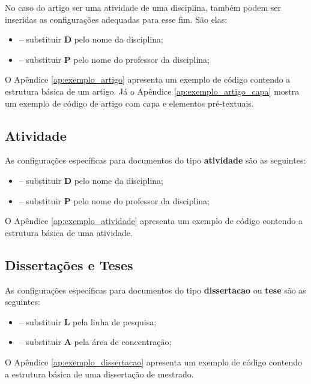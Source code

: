 \documentclass[artigo]{iftex2024}
\begin{document}
No caso do artigo ser uma atividade de uma disciplina, também podem ser inseridas as configurações adequadas para esse fim.
São elas:
\begin{itemize}
  \item[]  -- substituir \textbf{D} pelo nome da disciplina;
  \item[]  -- substituir \textbf{P} pelo nome do professor da disciplina;
\end{itemize}

O Apêndice \ref{ap:exemplo_artigo} apresenta um exemplo de código contendo a estrutura básica de um artigo.
Já o Apêndice \ref{ap:exemplo_artigo_capa} mostra um exemplo de código de artigo com capa e elementos pré-textuais.

\subsection{Atividade}

As configurações específicas para documentos do tipo \textbf{atividade} são as seguintes:
\begin{itemize}
  \item[]  -- substituir \textbf{D} pelo nome da disciplina;

  \item[]  -- substituir \textbf{P} pelo nome do professor da disciplina;
\end{itemize}

O Apêndice \ref{ap:exemplo_atividade} apresenta um exemplo de código contendo a estrutura básica de uma atividade.

\subsection{Dissertações e Teses}

As configurações específicas para documentos do tipo \textbf{dissertacao} ou \textbf{tese} são as seguintes:
\begin{itemize}
  \item[] \comando{linhapesquisa\{L\}]} -- substituir \textbf{L} pela linha de pesquisa;

  \item[] \comando{areaconcentracao\{A\}]} -- substituir \textbf{A} pela área de concentração;
\end{itemize}

O Apêndice \ref{ap:exemplo_dissertacao} apresenta um exemplo de código contendo a estrutura básica de uma dissertação de mestrado.
\end{document}
